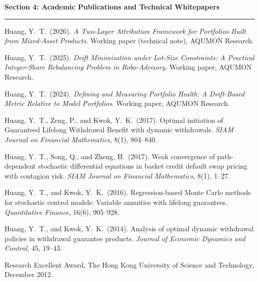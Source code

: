 \documentclass[11pt]{article}
\newcommand{\CVSection}[1]{\vspace{6pt}\textbf{\large #1}\par\vspace{2pt}\hrule\vspace{6pt}}
\begin{document}
\CVSection{Section 4: Academic Publications and Technical Whitepapers}

Huang, Y.\ T.\ (2026). \textit{A Two-Layer Attribution Framework for Portfolios Built from Mixed-Asset Products}. Working paper (technical note), AQUMON Research.

Huang, Y.\ T.\ (2025). \textit{Drift Minimization under Lot-Size Constraints: A Practical Integer-Share Rebalancing Problem in Robo-Advisory}. Working paper, AQUMON Research.

Huang, Y.\ T.\ (2024). \textit{Defining and Measuring Portfolio Health: A Drift-Based Metric Relative to Model Portfolios}. Working paper, AQUMON Research.


Huang, Y.\ T., Zeng, P., and Kwok, Y.\ K.\ (2017). Optimal initiation of Guaranteed Lifelong Withdrawal Benefit with dynamic withdrawals. \textit{SIAM Journal on Financial Mathematics}, 8(1), 804--840.

Huang, Y.\ T., Song, Q., and Zheng, H.\ (2017). Weak convergence of path-dependent stochastic differential equations in basket credit default swap pricing with contagion risk. \textit{SIAM Journal on Financial Mathematics}, 8(1), 1--27.

Huang, Y.\ T., and Kwok, Y.\ K.\ (2016). Regression-based Monte Carlo methods for stochastic control models: Variable annuities with lifelong guarantees. \textit{Quantitative Finance}, 16(6), 905--928.

Huang, Y.\ T., and Kwok, Y.\ K.\ (2014). Analysis of optimal dynamic withdrawal policies in withdrawal guarantee products. \textit{Journal of Economic Dynamics and Control}, 45, 19--43.

Research Excellent Award, The Hong Kong University of Science and Technology, December 2012.
\end{document}

